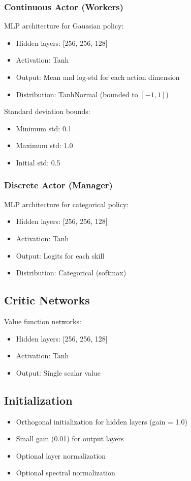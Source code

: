 \documentclass[11pt]{article}
\begin{document}
\subsubsection{Continuous Actor (Workers)}

MLP architecture for Gaussian policy:
\begin{itemize}
    \item Hidden layers: [256, 256, 128]
    \item Activation: Tanh
    \item Output: Mean and log-std for each action dimension
    \item Distribution: TanhNormal (bounded to $[-1, 1]$)
\end{itemize}

Standard deviation bounds:
\begin{itemize}
    \item Minimum std: 0.1
    \item Maximum std: 1.0
    \item Initial std: 0.5
\end{itemize}

\subsubsection{Discrete Actor (Manager)}

MLP architecture for categorical policy:
\begin{itemize}
    \item Hidden layers: [256, 256, 128]
    \item Activation: Tanh
    \item Output: Logits for each skill
    \item Distribution: Categorical (softmax)
\end{itemize}

\subsection{Critic Networks}

Value function networks:
\begin{itemize}
    \item Hidden layers: [256, 256, 128]
    \item Activation: Tanh
    \item Output: Single scalar value
\end{itemize}

\subsection{Initialization}
\begin{itemize}
    \item Orthogonal initialization for hidden layers (gain = 1.0)
    \item Small gain (0.01) for output layers
    \item Optional layer normalization
    \item Optional spectral normalization
\end{itemize}
\end{document}
